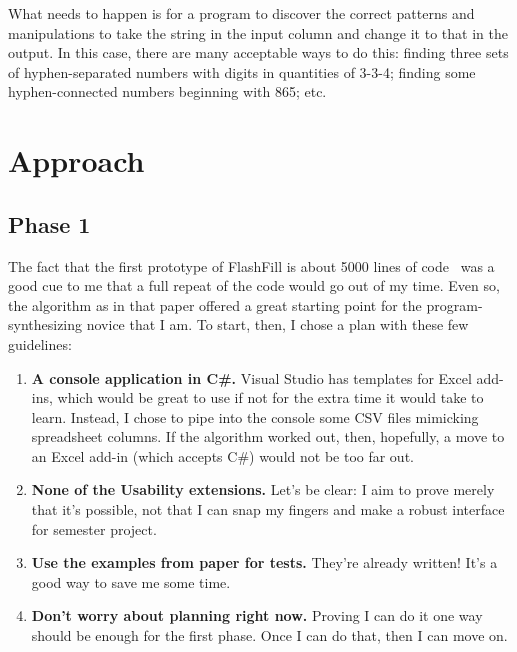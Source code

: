 \documentclass[11pt]{article} \usepackage{cite} \usepackage{marginnote}
\begin{document}
	What needs to happen is for a program to discover the correct patterns and
	manipulations to take the string in the input column and change it to that in
	the output. In this case, there are many acceptable ways to do this: finding
	three sets of hyphen-separated numbers with digits in quantities of 3-3-4;
	finding some hyphen-connected numbers beginning with 865; etc.
	
	\section{Approach} \subsection{Phase 1} The fact that the first prototype of
	FlashFill is about 5000 lines of code~\cite{gulwani2011automating} was a good
	cue to me that a full repeat of the code would go out of my time. Even so, the
	algorithm as in that paper offered a great starting point for the
	program-synthesizing novice that I am. To start, then, I chose a plan with
	these few guidelines:
	
	\begin{enumerate}
		
		\item \textbf{A console application in C\#.} Visual Studio has templates for
		Excel add-ins, which would be great to use if not for the extra time it would
		take to learn. Instead, I chose to pipe into the console some CSV files
		mimicking spreadsheet columns. If the algorithm worked out, then, hopefully,
		a move to an Excel add-in (which accepts C\#) would not be too far out.
		
		\item \textbf{None of the Usability extensions.} Let's be clear: I aim to
		prove merely that it's possible, not that I can snap my fingers and make a
		robust interface for semester project.
		
		\item \textbf{Use the examples from paper for tests.} They're already
		written! It's a good way to save me some time.
		
		\item \textbf{Don't worry about planning right now.} Proving I can do it one
		way should be enough for the first phase. Once I can do that, then I can move
		on.
		
	\end{enumerate}
	
	{} 
	
\end{document}
